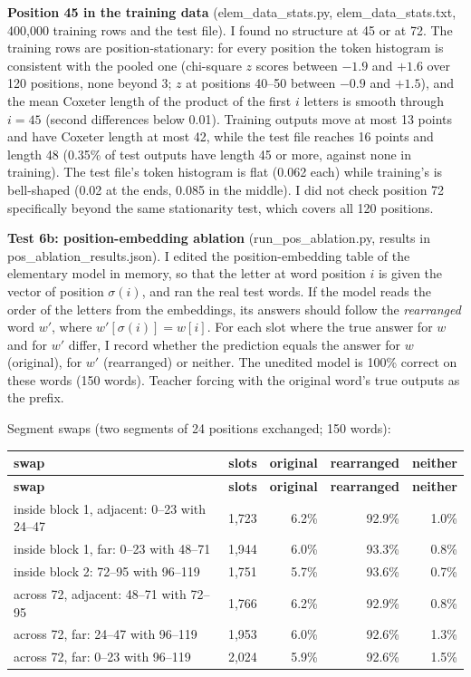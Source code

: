\documentclass[paper=a4,fontsize=11pt,DIV=11,parskip=half,headings=small,numbers=noendperiod]{scrartcl}
\DeclareRobustCommand{\lead}[1]{\textsf{\bfseries\color{accent}#1}}
\DeclareRobustCommand{\code}[1]{{\fontseries{m}\ttfamily #1}}
\DeclareRobustCommand{\hdr}[1]{\textsf{\bfseries #1}}
\begin{document}
\lead{Position 45 in the training data} (\code{elem\_\allowbreak{}data\_\allowbreak{}stats.\allowbreak{}py},
\code{elem\_\allowbreak{}data\_\allowbreak{}stats.\allowbreak{}txt}, 400,000 training rows and the test file). I
found no structure at 45 or at 72. The training rows are position-stationary: for every position the token
histogram is consistent with the pooled one (chi-square $z$ scores between $-1.9$ and $+1.6$ over 120 positions,
none beyond 3; $z$ at positions 40–50 between $-0.9$ and $+1.5$), and the mean Coxeter length of the product of
the first $i$ letters is smooth through $i=45$ (second differences below 0.01). Training outputs move at most 13
points and have Coxeter length at most 42, while the test file reaches 16 points and length 48 (0.35\% of test
outputs have length 45 or more, against none in training). The test file’s token histogram is flat (0.062 each)
while training’s is bell-shaped (0.02 at the ends, 0.085 in the middle). I did not check position 72
specifically beyond the same stationarity test, which covers all 120 positions.

\lead{Test 6b: position-embedding ablation}
(\code{run\_\allowbreak{}pos\_\allowbreak{}ablation.\allowbreak{}py}, results in
\code{pos\_\allowbreak{}ablation\_\allowbreak{}results.\allowbreak{}json}). I edited the position-embedding
table of the elementary model in memory, so that the letter at word position $i$ is given the vector of position
$\sigma(i)$, and ran the real test words. If the model reads the order of the letters from the embeddings, its
answers should follow the \emph{rearranged} word $w'$, where $w'[\sigma(i)]=w[i]$. For each slot where the true
answer for $w$ and for $w'$ differ, I record whether the prediction equals the answer for $w$ (original), for
$w'$ (rearranged) or neither. The unedited model is 100\% correct on these words (150 words). Teacher forcing
with the original word’s true outputs as the prefix.

Segment swaps (two segments of 24 positions exchanged; 150 words):

{\small\nopagebreak[4]
\begin{longtable}{@{}>{\raggedright\arraybackslash}p{6.0cm} r r r r@{}}
\toprule
\hdr{swap} & \hdr{slots} & \hdr{original} & \hdr{rearranged} & \hdr{neither} \\
\midrule
\endfirsthead
\toprule
\hdr{swap} & \hdr{slots} & \hdr{original} & \hdr{rearranged} & \hdr{neither} \\
\midrule
\endhead
\bottomrule
\endlastfoot
inside block 1, adjacent: 0–23 with 24–47 & 1,723 & 6.2\% & 92.9\% & 1.0\% \\
inside block 1, far: 0–23 with 48–71 & 1,944 & 6.0\% & 93.3\% & 0.8\% \\
inside block 2: 72–95 with 96–119 & 1,751 & 5.7\% & 93.6\% & 0.7\% \\
across 72, adjacent: 48–71 with 72–95 & 1,766 & 6.2\% & 92.9\% & 0.8\% \\
across 72, far: 24–47 with 96–119 & 1,953 & 6.0\% & 92.6\% & 1.3\% \\
across 72, far: 0–23 with 96–119 & 2,024 & 5.9\% & 92.6\% & 1.5\% \\
\end{longtable}}
\end{document}
